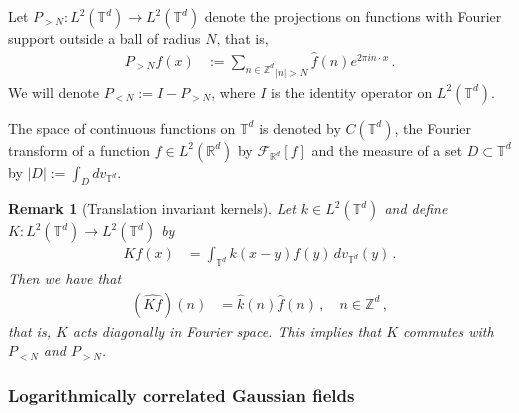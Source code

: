 \documentclass[11pt]{article}
\numberwithin{equation}{section}
\newtheorem{remark}[theorem]{Remark}
\theoremstyle{definition}
\newcommand{\R}{\mathbb{R}}
\newcommand{\Z}{\mathbb{Z}}
\def\T{\mathbb{T}}
\newcommand{\sq}{{(0,1)^{2}}}
\newcommand{\PN}{ {P_{< N}} }
\newcommand{\PNN}{ {P_{>N}} }
\newcommand{\F}[1]{ { \hat{#1} } }
\begin{document}
Let $\PNN: L^2(\T^d) \to L^2(\T^d)$ denote the projections on functions with Fourier support outside a ball of radius $N$, that is, 
\begin{align*}
\PNN f (x) &:= \underset{|n| > N}{\sum_{n \in \mathbb{Z}^d}} \hat f (n) e^{2 \pi i n \cdot x}\,.
\end{align*}
We will denote $\PN := I-\PNN$, where $I$ is the identity operator on $L^2(\T^d)$.


The space of continuous functions on $\T^d$ is denoted by $C(\T^d)$, the Fourier transform of a function $f \in L^2(\R^d)$ by $\mathcal{F}_{\R^d}[f]$ and the measure of a set $D \subset \T^d$ by $|D| := \int_D dv_{\T^d}$.

\begin{remark}[Translation invariant kernels]\label{rem:translation_invairance}
Let $k \in L^2(\T^d)$ and define $K: L^2(\T^d) \to L^2(\T^d)$ by 
\begin{align*}
Kf(x) &= \int_{\T^d} k(x-y) f(y) \, dv_{\T^d}(y)\,.
\end{align*}
Then we have that
\begin{align*}
(\widehat{Kf})(n) &= \F{k}(n) \F{f}(n) \,, \quad n \in \Z^d\,,
\end{align*}
that is, $K$ acts diagonally in Fourier space. This implies that $K$ commutes with $\PN$ and $\PNN$.
\end{remark}



\subsubsection{Logarithmically correlated Gaussian fields}\label{sec:log_fields}
\end{document}

